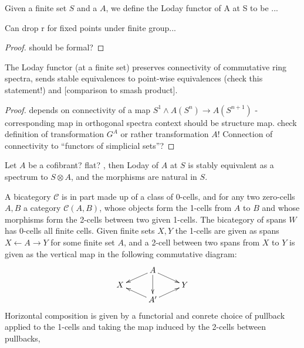    \begin{defn}\label{def_loday_functor_finite_sets}
      Given a finite set $S$ and a \hring $A$, we define the Loday functor of A at S to be ...
    \end{defn}

    \begin{lem}\label{lem_loday_functor_fixed_points}
      Can drop r for fixed points under finite group...
      \begin{proof}
        should be formal?
      \end{proof}
    \end{lem}

    \begin{lem}\label{lem_loday_functor_preserves_connectivity}
      The Loday functor (at a finite set) preserves connectivity of commutative ring spectra, sends stable equivalences to point-wise equivalences (check this statement!) and [comparison to smash product].
      \begin{proof}
        depends on connectivity of a map $S^1 \wedge A(S^n) \to A(S^{n+1})$ - corresponding map in orthogonal spectra context should be structure map. check definition of transformation $G^A$ or rather transformation $A$! Connection of connectivity to ``functors of simplicial sets''?
      \end{proof}
    \end{lem}

    \begin{cor}\label{cor_loday_at_S_naturally_equivalent_to_tensor_with_S}
      Let $A$ be a cofibrant? flat? \hring, then Loday of $A$ at $S$ is stably equivalent as a spectrum to $S \otimes A$, and the morphisms are natural in $S$.
    \end{cor}


    A bicategory $\mathcal{C}$ is in part made up of a class of 0-cells, and for any two zero-cells $A,B$ a category $\mathcal{C}(A,B)$, whose objects form the 1-cells from $A$ to $B$ and whose morphisms form the 2-cells between two given 1-cells. The bicategory of spans $W$ has 0-cells all finite cells. Given finite sets $X,Y$ the 1-cells are given as spans $ X \leftarrow A \rightarrow Y$ for some finite set $A$, and a 2-cell between two spans from $X$ to $Y$  is given as the vertical map in the following commutative diagram:
    \[
    \xymatrix@R-=.5em{
      &
      A \ar[dl] \ar[dd] \ar[dr]
      \\
      X
      &
      &
      Y
      \\
      &
      A^\prime \ar[ul] \ar[ur]
      &
    }
    \]
    Horizontal composition is given by a functorial and conrete choice of pullback applied to the 1-cells and taking the map induced by the 2-cells between pullbacks,

